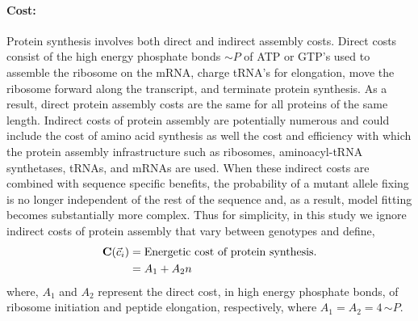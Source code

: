 \documentclass[12pt,letterpaper,fleqn]{article}
\newcommand{\Costcveci}{\ensuremath{\Cost(\cveci)}\xspace}
\newcommand{\Cost}{\ensuremath{\text{\textbf{C}}}\xspace}
\newcommand{\simP}{\ensuremath{\sim P}\xspace}
\newcommand{\cveci}{\ensuremath{\cvec_i}\xspace}
\newcommand{\cvec}{\ensuremath{\Vec{c}}\xspace}
\begin{document}
\paragraph{Cost:}
Protein synthesis involves both direct and indirect assembly costs.
Direct costs consist of the high energy phosphate bonds \simP of ATP or GTP's used to assemble the ribosome on the mRNA, charge tRNA's for elongation, move the ribosome forward along the transcript, and terminate protein synthesis.
As a result, direct protein assembly costs are the same for all proteins of the same length.
Indirect costs of protein assembly are potentially numerous and could include the cost of amino acid synthesis as well the cost and efficiency with which the protein assembly infrastructure such as ribosomes, aminoacyl-tRNA synthetases, tRNAs, and mRNAs are used.
When these indirect costs are combined with sequence specific benefits, the probability of a mutant allele fixing is no longer independent of the rest of the sequence \citep{GilchristEtAl2015} and, as a result, model fitting becomes substantially more complex.
Thus for simplicity, in this study we ignore indirect costs of protein assembly that vary between genotypes and define,
\begin{align}
\label{eq:defineCost}
  \Costcveci  &= \text{Energetic cost of protein synthesis.}\\
  &= A_1 + A_2 n
\end{align}
where, $A_1$ and $A_2$ represent the direct cost, in high energy phosphate bonds, of ribosome initiation and peptide elongation, respectively, where $A_1 = A_2 = 4  \, \simP$.
\end{document}
